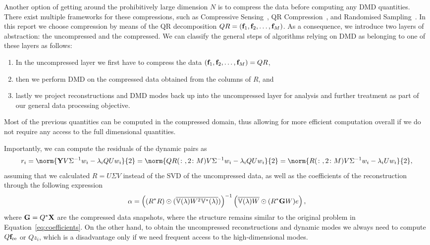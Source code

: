 Another option of getting around the prohibitively large dimension $N$ is to compress the data before computing any DMD quantities. There exist multiple frameworks for these compressions, such as Compressive Sensing~\cite{Brunton2016a}, QR Compression~\cite{Drmac2020VandermondeKhatriRao}, and Randomised Sampling~\cite{Erichson2019}. In this report we choose compression by means of the QR decomposition $Q R = (\mathbf{f}_1, \mathbf{f}_2, \dots, \mathbf{f}_M)$. As a consequence, we introduce two layers of abstraction: the uncompressed and the compressed. We can classify the general steps of algorithms relying on DMD as belonging to one of these layers as follows:
\begin{enumerate}
    \item In the uncompressed layer we first have to compress the data $(\mathbf{f}_1, \mathbf{f}_2, \dots, \mathbf{f}_M) = Q R$,
    \item then we perform DMD on the compressed data obtained from the columns of $R$, and
    \item lastly we project reconstructions and DMD modes back up into the uncompressed layer for analysis and further treatment as part of our general data processing objective.
\end{enumerate}
Most of the previous quantities can be computed in the compressed domain, thus allowing for more efficient computation overall if we do not require any access to the full dimensional quantities.

Importantly, we can compute the residuals of the dynamic pairs as
\begin{equation*}
    r_i = \norm{\bl{Y} V \Sigma^{-1} w_i - \lambda_i Q U w_i}{2} = \norm{Q R(\colon, 2 \colon M) V \Sigma^{-1} w_i - \lambda_i Q U w_i}{2} = \norm{R(\colon, 2 \colon M) V \Sigma^{-1} w_i - \lambda_i U w_i}{2},
\end{equation*}
assuming that we calculated $R = U \Sigma V$ instead of the SVD of the uncompressed data, as well as the coefficients of the reconstruction through the following expression
\begin{equation*}
    \alpha = {\left( (R^* R) \odot (\overline{\mathbb{V}(\lambda) W^2 \mathbb{V}^*(\lambda)}) \right)}^{-1} \left( \overline{\mathbb{V}(\lambda) W} \odot (R^* \mathbf{G} W) e \right),
\end{equation*}
where $\mathbf{G} = Q^* \mathbf{X}$ are the compressed  data snapshots, where the structure remains similar to the original problem in Equation~\eqref{eq:coefficients}. On the other hand, to obtain the uncompressed reconstructions and dynamic modes we always need to compute $Q \mathbf{f}_\text{re}$ or $Q z_i$, which is a disadvantage only if we need frequent access to the high-dimensional modes.

